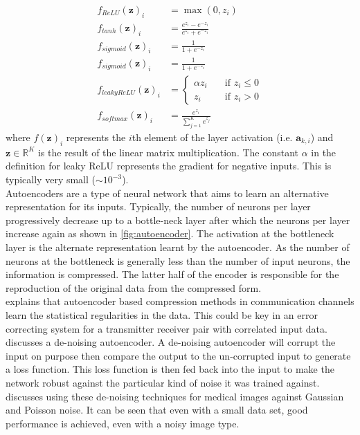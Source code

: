     \begin{equation}
    	\label{eqn:activation_functions}
    	\begin{split}
    		f_{ReLU}(\boldsymbol{z})_i &= \max(0,z_i)\\
    		f_{tanh}(\boldsymbol{z})_i &= \frac{e^{z_i}-e^{-z_i}}{e^{z_i}+e^{-z_i}}\\
    		f_{sigmoid}(\boldsymbol{z})_i &= \frac{1}{1+e^{-z_i}}\\
    		f_{sigmoid}(\boldsymbol{z})_i &= \frac{1}{1+e^{-z_i}}\\
    		f_{leakyReLU}(\boldsymbol{z})_i &= 
            \begin{cases}
                \alpha z_i \quad & \text{if $z_i\leq 0$} \\
                z_i \quad & \text{if $z_i>0$}
            \end{cases}\\
    		f_{softmax}(\boldsymbol{z})_i &= \frac{e^{z_i}}{\sum_{j=1}^{K}e^{z_j}}
    	\end{split}
    \end{equation}
    where $f(\boldsymbol{z})_i$ represents the $i$th element of the layer activation (i.e. $\boldsymbol{a}_{k,i}$) and $\boldsymbol{z} \in \mathbb{R}^K$ is the result of the linear matrix multiplication. The constant $\alpha$ in the definition for leaky ReLU represents the gradient for negative inputs. This is typically very small ($\sim10^{-3}$).
    \\
    
    Autoencoders are a type of neural network that aims to learn an alternative representation for its inputs. Typically, the number of neurons per layer progressively decrease up to a bottle-neck layer after which the neurons per layer increase again as shown in \autoref{fig:autoencoder}. The activation at the bottleneck layer is the alternate representation learnt by the autoencoder. As the number of neurons at the bottleneck is generally less than the number of input neurons, the information is compressed. The latter half of the encoder is responsible for the reproduction of the original data from the compressed form.
    \\
    
    \autocite{8820761} explains that autoencoder based compression methods in communication channels learn the statistical regularities in the data. This could be key in an error correcting system for a transmitter receiver pair with correlated input data. \autocite{9058605} discusses a de-noising autoencoder. A de-noising autoencoder will corrupt the input on purpose then compare the output to the un-corrupted input to generate a loss function. This loss function is then fed back into the input to make the network robust against the particular kind of noise it was trained against. \autocite{7836672} discusses using these de-noising techniques for medical images against Gaussian and Poisson noise. It can be seen that even with a small data set, good performance is achieved, even with a noisy image type.
    \\
    
